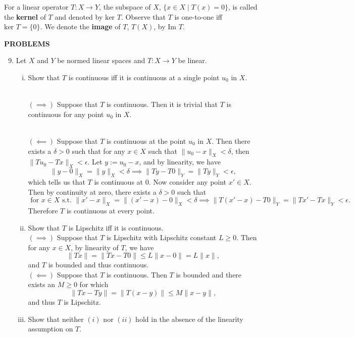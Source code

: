 For a linear operator $T:X\to Y$, the subspace of $X$, $\{x\in X\mid T(x)=0\}$, is called the \textbf{kernel} of $T$ and denoted by $\text{ker }T$.
Observe that $T$ is one-to-one iff $\text{ker }T=\{0\}$.
We denote the \textbf{image} of $T$, $T(X)$, by $\text{Im }T$.

\begin{center}
	\textbf{PROBLEMS}
\end{center}
\begin{enumerate}
	\setcounter{enumi}{8}
    \item Let $X$ and $Y$ be normed linear spaces and $T:X\to Y$ be linear.
    \begin{enumerate}[(i)]
        \item Show that $T$ is continuous iff it is continuous at a single point $u_0$ in $X$.
        
        \ \\$(\implies)$ Suppose that $T$ is continuous.
        Then it is trivial that $T$ is continuous for any point $u_0$ in $X$.

        \ \\$(\impliedby)$ Suppose that $T$ is continuous at the point $u_0$ in $X$.
        Then there exists a $\delta>0$ such that for any $x\in X$ such that $\|u_0-x\|_X<\delta$, then $\|Tu_0-Tx\|_X<\epsilon$. 
        Let $y:=u_0-x$, and by linearity, we have
        \[
            \|y-0\|_X=\|y\|_X<\delta\implies \|Ty-T0\|_Y=\|Ty\|_Y<\epsilon,
        \]
        which tells us that $T$ is continuous at $0$.
        Now consider any point $x'\in X$.
        Then by continuity at zero, there exists a $\delta>0$ such that 
        \[
            \text{ for }x\in X\text{ s.t. }\|x'-x\|_X=\|(x'-x)-0\|_X<\delta\implies\|T(x'-x)-T0\|_Y=\|Tx'-Tx\|_Y<\epsilon.
        \]
        Therefore $T$ is continuous at every point.
        \ \\\item Show that $T$ is Lipschitz iff it is continuous.
        \\$(\implies)$ Suppose that $T$ is Lipschitz with Lipschitz constant $L\ge0$.
        Then for any $x\in X$, by linearity of $T$, we have
        \[  
            \|Tx\|=\|Tx-T0\|\le L\|x-0\|=L\|x\|,
        \]
        and $T$ is bounded and thus continuous.
        \\$(\impliedby)$ Suppose that $T$ is continuous.
        Then $T$ is bounded and there exists an $M\ge0$ for which 
        \[  
            \|Tx-Ty\|=\|T(x-y)\|\le M\|x-y\|,
        \]
        and thus $T$ is Lipschitz.
        \\\item Show that neither $(i)$ nor $(ii)$ hold in the absence of the linearity assumption on $T$. 


\end{enumerate}
\end{enumerate}
